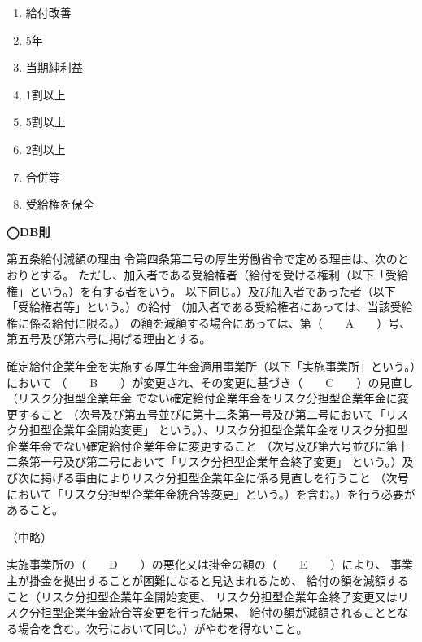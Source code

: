 \begin{answerbox}
  \begin{enumerate}[A:]
    \item 給付改善
    \item 5年
    \item 当期純利益
    \item 1割以上
    \item 5割以上
    \item 2割以上
    \item 合併等
    \item 受給権を保全
  \end{enumerate}
\end{answerbox}

\begin{fillblank}[数理人試験 \ 2024 \ 問題1 \ 設問2]
  \begin{lawstructure}
    \noindent \textbf{◯DB則}
    \begin{lawarticle}{第五条}{給付減額の理由}
        令第四条第二号の厚生労働省令で定める理由は、次のとおりとする。
        ただし、加入者である受給権者（給付を受ける権利（以下「受給権」という。）を有する者をいう。
        以下同じ。）及び加入者であった者（以下「受給権者等」という。）の給付
        （加入者である受給権者にあっては、当該受給権に係る給付に限る。）
        の額を減額する場合にあっては、第（　　A　　）号、第五号及び第六号に掲げる理由とする。

        確定給付企業年金を実施する厚生年金適用事業所（以下「実施事業所」という。）において
        （　　B　　）が変更され、その変更に基づき（　　C　　）の見直し（リスク分担型企業年金
        でない確定給付企業年金をリスク分担型企業年金に変更すること
        （次号及び第五号並びに第十二条第一号及び第二号において「リスク分担型企業年金開始変更」
        という。）、リスク分担型企業年金をリスク分担型企業年金でない確定給付企業年金に変更すること
        （次号及び第六号並びに第十二条第一号及び第二号において「リスク分担型企業年金終了変更」
        という。）及び次に掲げる事由によりリスク分担型企業年金に係る見直しを行うこと
        （次号において「リスク分担型企業年金統合等変更」という。）を含む。）を行う必要があること。
        
        （中略）

        実施事業所の（　　D　　）の悪化又は掛金の額の（　　E　　）により、
        事業主が掛金を拠出することが困難になると見込まれるため、
        給付の額を減額すること（リスク分担型企業年金開始変更、
        リスク分担型企業年金終了変更又はリスク分担型企業年金統合等変更を行った結果、
        給付の額が減額されることとなる場合を含む。次号において同じ。）がやむを得ないこと。


\end{lawarticle}
\end{lawstructure}
\end{fillblank}
